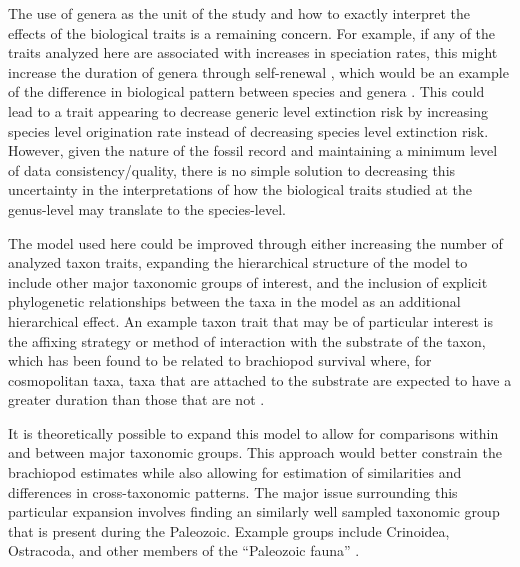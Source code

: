 \documentclass{article}
\begin{document}
The use of genera as the unit of the study and how to exactly interpret the effects of the biological traits is a remaining concern. For example, if any of the traits analyzed here are associated with increases in speciation rates, this might increase the duration of genera through self-renewal \citep{Raup1991b,Raup1994}, which would be an example of the difference in biological pattern between species and genera \citep{Jablonski1987,Jablonski2007,Jablonski2008a}. This could lead to a trait appearing to decrease generic level extinction risk by increasing species level origination rate instead of decreasing species level extinction risk. However, given the nature of the fossil record and maintaining a minimum level of data consistency/quality, there is no simple solution to decreasing this uncertainty in the interpretations of how the biological traits studied at the genus-level may translate to the species-level.

The model used here could be improved through either increasing the number of analyzed taxon traits, expanding the hierarchical structure of the model to include other major taxonomic groups of interest, and the inclusion of explicit phylogenetic relationships between the taxa in the model as an additional hierarchical effect. An example taxon trait that may be of particular interest is the affixing strategy or method of interaction with the substrate of the taxon, which has been found to be related to brachiopod survival where, for cosmopolitan taxa, taxa that are attached to the substrate are expected to have a greater duration than those that are not \citep{Alexander1977}.

It is theoretically possible to expand this model to allow for comparisons within and between major taxonomic groups. This approach would better constrain the brachiopod estimates while also allowing for estimation of similarities and differences in cross-taxonomic patterns. The major issue surrounding this particular expansion involves finding an similarly well sampled taxonomic group that is present during the Paleozoic. Example groups include Crinoidea, Ostracoda, and other members of the ``Paleozoic fauna'' \citep{SepkoskiJr.1981a}.
\end{document}
